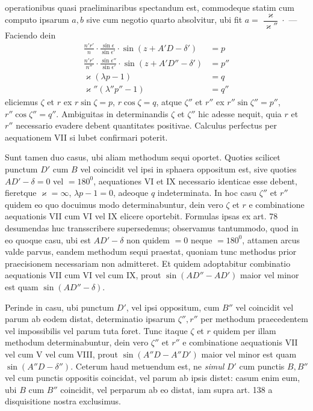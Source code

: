 operationibus quasi praeliminaribus spectandum est, commodeque statim cum
computo ipsarum $a,b$ sive cum negotio quarto absolvitur, ubi fit
$a=\dfrac{\varkappa}{\varkappa''}\mathpunct{\cdot}$ — Faciendo dein
\[
\begin{aligned}
\frac{n'r'}{n}\cdot\frac{\sin\epsilon}{\sin\epsilon'}\cdot\sin(z+A'D-\delta')&=p\\[.5ex]
\frac{n'r'}{n''}\cdot\frac{\sin\epsilon''}{\sin\epsilon'}\cdot\sin(z+A'D''-\delta')&=p''\\[.5ex]
\varkappa(\lambda p-1)&=q\\[.5ex]
\varkappa''(\lambda''p''-1)&=q''
\end{aligned}
\]
eliciemus $\zeta$ et $r$ ex $r\sin\zeta=p$, $r\cos\zeta=q$, atque $\zeta''$ et $r''$ ex $r''\sin\zeta''=p''$,
$r''\cos\zeta''=q''$. Ambiguitas in determinandis $\zeta$ et $\zeta''$ hic adesse nequit, quia $r$
et $r''$ necessario evadere debent quantitates positivae. Calculus perfectus per
aequationem VII si lubet confirmari poterit.

Sunt tamen duo casus, ubi aliam methodum sequi oportet. Quoties scilicet punctum $D'$ cum $B$ vel coincidit vel ipsi in sphaera oppositum est,
sive quoties $AD'-\delta=0$ vel $=180^0$, aequationes VI et IX necessario identicae esse debent, fieretque $\varkappa=\infty$, $\lambda p-1=0$, adeoque $q$ indeterminata. In
hoc casu $\zeta''$ et $r''$ quidem eo quo docuimus modo determinabuntur, dein vero
$\zeta$ et $r$ e combinatione aequationis VII cum VI vel IX elicere oportebit. Formulas ipsas ex art. 78 desumendas huc transscribere supersedemus; observamus tantummodo, quod in eo quoque casu, ubi est $AD'-\delta$ non quidem $=0$
neque $=180^0$, attamen arcus valde parvus, eandem methodum sequi praestat,
quoniam tunc methodus prior praecisionem necessariam non admitteret. Et
quidem adoptabitur combinatio aequationis VII cum VI vel cum IX, prout
$\sin(AD''-AD')$ maior vel minor est quam $\sin(AD''-\delta)$.

Perinde in casu, ubi punctum $D'$, vel ipsi oppositum, cum $B''$ vel coincidit vel parum ab eodem distat, determinatio ipsarum $\zeta'',r''$ per methodum
praecedentem vel impossibilis vel parum tuta foret. Tunc itaque $\zeta$ et $r$ quidem per illam methodum determinabuntur, dein vero $\zeta''$ et $r''$ e combinatione
aequationis VII vel cum V vel cum VIII, prout $\sin(A''D-A''D')$ maior vel
minor est quam $\sin(A''D-\delta'')$. Ceterum haud metuendum est, ne \emph{simul} $D'$
cum punctis $B,B''$ vel cum punctis oppositis coincidat, vel parum ab ipsis
distet: casum enim eum, ubi $B$ cum $B''$ coincidit, vel perparum ab eo distat,
iam supra art. 138 a disquisitione nostra exclusimus.
